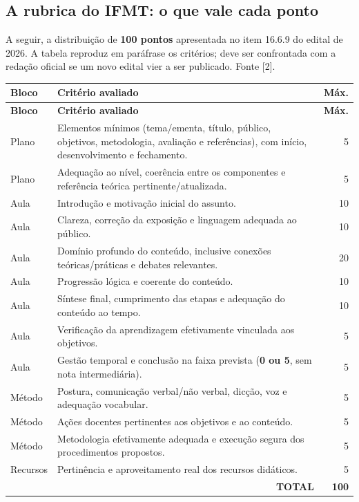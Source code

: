 \documentclass[11pt,a4paper]{article}
\begin{document}
\subsection{A rubrica do IFMT: o que vale cada ponto}
A seguir, a distribuição de \textbf{100 pontos} apresentada no item 16.6.9 do edital de 2026. A tabela reproduz em paráfrase os critérios; deve ser confrontada com a redação oficial se um novo edital vier a ser publicado. Fonte [2].
\begin{longtable}{p{}p{}r}
\toprule
\textbf{Bloco} & \textbf{Critério avaliado} & \textbf{Máx.}\\\midrule
\endfirsthead
\toprule\textbf{Bloco}&\textbf{Critério avaliado}&\textbf{Máx.}\\\midrule\endhead
Plano & Elementos mínimos (tema/ementa, título, público, objetivos, metodologia, avaliação e referências), com início, desenvolvimento e fechamento. &5\\
Plano & Adequação ao nível, coerência entre os componentes e referência teórica pertinente/atualizada. &5\\
Aula & Introdução e motivação inicial do assunto. &10\\
Aula & Clareza, correção da exposição e linguagem adequada ao público. &10\\
Aula & Domínio profundo do conteúdo, inclusive conexões teóricas/práticas e debates relevantes. &20\\
Aula & Progressão lógica e coerente do conteúdo. &10\\
Aula & Síntese final, cumprimento das etapas e adequação do conteúdo ao tempo. &10\\
Aula & Verificação da aprendizagem efetivamente vinculada aos objetivos. &5\\
Aula & Gestão temporal e conclusão na faixa prevista (\textbf{0 ou 5}, sem nota intermediária). &5\\
Método & Postura, comunicação verbal/não verbal, dicção, voz e adequação vocabular. &5\\
Método & Ações docentes pertinentes aos objetivos e ao conteúdo. &5\\
Método & Metodologia efetivamente adequada e execução segura dos procedimentos propostos. &5\\
Recursos & Pertinência e aproveitamento real dos recursos didáticos. &5\\\midrule
\multicolumn{2}{r}{\textbf{TOTAL}}&\textbf{100}\\\bottomrule
\end{longtable}
\end{document}

